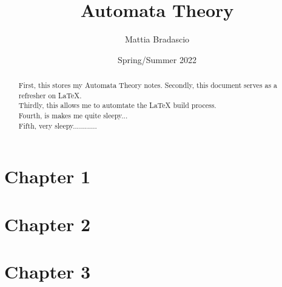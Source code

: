\documentclass[12pt, letterpaper]{article}
\title{Automata Theory}
\author{Mattia Bradascio}
\date{Spring/Summer 2022}
\begin{document}
\begin{titlepage}
\maketitle
\end{titlepage}

\begin{abstract}

    First, this stores my Automata Theory notes.
    \indent Secondly, this document serves as a refresher on LaTeX. \\
    \indent Thirdly, this allows me to automtate the LaTeX build process. \\ 
    \indent Fourth, is makes me quite sleepy... \\
    \indent Fifth, very sleepy............

\end{abstract}

\section{Chapter 1}


\section{Chapter 2}


\section{Chapter 3}

\end{document}
